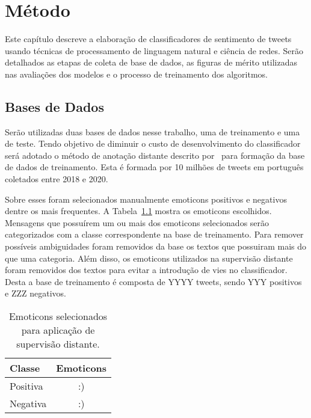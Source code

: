 \chapter{Método}
\label{chapter:method}

Este capítulo descreve a elaboração de classificadores de sentimento de tweets
usando técnicas de processamento de linguagem natural e ciência de redes.
Serão detalhados as etapas de coleta de base de dados, as figuras de mérito
utilizadas nas avaliações dos modelos e o processo de treinamento dos
algoritmos.

\section{Bases de Dados}

Serão utilizadas duas bases de dados nesse trabalho, uma de treinamento e uma de
teste.
Tendo objetivo de diminuir o custo de desenvolvimento do classificador será
adotado o método de anotação distante descrito por~\citet{go09} para formação da
base de dados de treinamento.
Esta é formada por 10 milhões de tweets em português coletados entre 2018 e 2020.

Sobre esses foram selecionados manualmente emoticons positivos e negativos
dentre os mais frequentes. A Tabela~\ref{tab:emoticons} mostra os emoticons
escolhidos.
Mensagens que possuírem um ou mais dos emoticons selecionados serão
categorizados com a classe correspondente na base de treinamento.
Para remover possíveis ambiguidades foram removidos da base os textos que
possuiram mais do que uma categoria.
Além disso, os emoticons utilizados na supervisão distante foram removidos dos
textos para evitar a introdução de vies no classificador.
Desta a base de treinamento é composta de YYYY tweets, sendo YYY positivos e ZZZ
negativos.

\begin{table}[h]
    \begin{center}
        \begin{tabular}{| l | c |}
        \hline
        \textbf{Classe} & \textbf{Emoticons} \\ \hline
        Positiva & :) \\ \hline
        Negativa & :) \\ \hline
        \end{tabular}
        \caption{Emoticons selecionados para aplicação de supervisão distante.}
        \label{tab:emoticons}
    \end{center}
\end{table}

